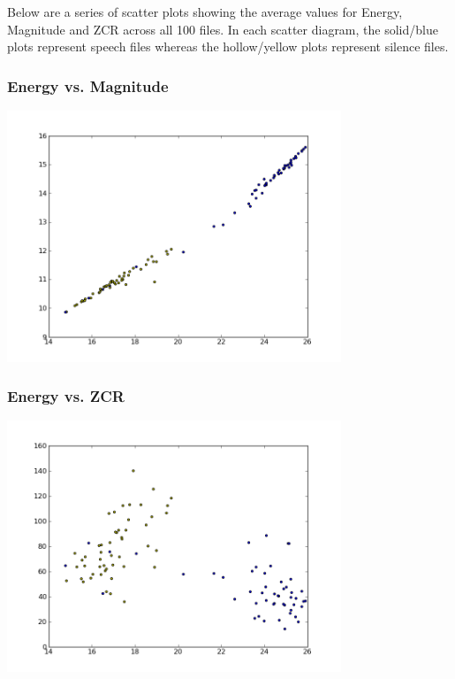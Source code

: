 \documentclass[12pt]{article} %
\begin{document}
Below are a series of scatter plots showing the average values for Energy, Magnitude and ZCR across
all 100 files. In each scatter diagram, the solid/blue plots represent speech files whereas the
hollow/yellow plots represent silence files.

\subsubsection{Energy vs. Magnitude}
\begin{center}
  \includegraphics[width=0.75\textwidth]{eng_mag}
\end{center}
\subsubsection{Energy vs. ZCR}
\begin{center}
  \includegraphics[width=0.75\textwidth]{eng_zcr}
\end{center}
\end{document}

